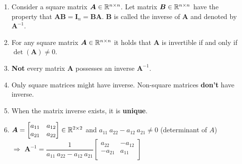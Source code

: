 \begin{enumerate}
    \item Consider a square matrix $\bm{A} \in \mathbb{R}^{n\times n}$.
    Let matrix $\bm{B} \in \mathbb{R}^{n\times n}$ have the property that $\bm{A}\bm{B} = \bm{I}_n = \bm{B}\bm{A}$.
    $\bm{B}$ is called the inverse of $\bm{A}$ and denoted by $\bm{A}^{-1}$.
    \hfill \cite{mfml/book/mml/Deisenroth-Faisal-Ong}

    \item
    \begin{theorem}
        For any square matrix $\bm{A} \in \mathbb{R}^{n\times n}$ it holds that $\bm{A}$ is invertible if and only if $\det(\bm{A})\neq 0$.
        \hfill \cite{mfml/book/mml/Deisenroth-Faisal-Ong}
    \end{theorem}

    \item \textbf{Not} every matrix $\bm{A}$ possesses an inverse $\bm{A}^{-1}$.
    \hfill \cite{mfml/book/mml/Deisenroth-Faisal-Ong}

    \item Only square matrices might have inverse. Non-square matrices \textbf{don't} have inverse.

    \item When the matrix inverse exists, it is \textbf{unique}.
    \hfill \cite{mfml/book/mml/Deisenroth-Faisal-Ong}

    \item $
        \bm{A} = \begin{bmatrix}
            a_{11} & a_{12} \\
            a_{21} & a_{22} \\
        \end{bmatrix}
        \in \mathbb{R}^{2\times 2}
    $
    \hspace{1cm} and \hspace{1cm}
    $a_{11}\ a_{22} - a_{12}\ a_{21} \neq 0$ (determinant of $A$)\\[0.4cm]
    $\Rightarrow$
    $
        \bm{A}^{-1} =
        \dfrac{1}{a_{11}\ a_{22} - a_{12}\ a_{21}}
        \begin{bmatrix}
            a_{22} & -a_{12} \\
            -a_{21} & a_{11} \\
        \end{bmatrix}
    $
    \hfill \cite{mfml/book/mml/Deisenroth-Faisal-Ong}

\end{enumerate}



